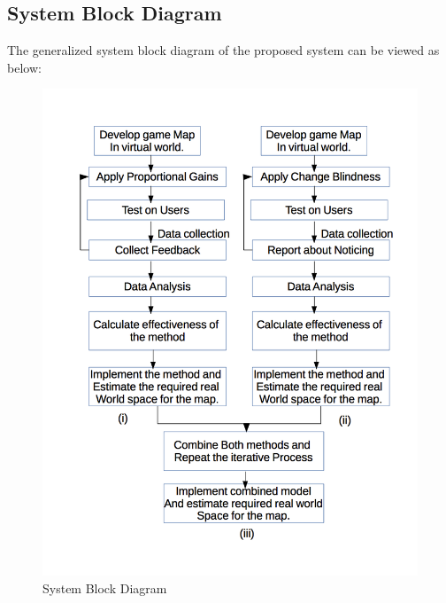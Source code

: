 \documentclass[12pt]{article}
\begin{document}
\subsection{System Block Diagram}
The generalized system block diagram of the proposed system can be viewed as below:
\begin{figure}[!ht]
\centering
\includegraphics[width = 0.9 \textwidth]{SBD_Redricted_walking}
\caption{System Block Diagram}
\end{figure}
\clearpage
\end{document}
